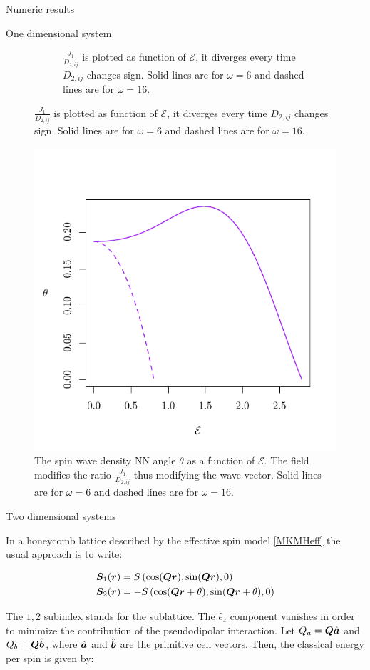 \begin{section}{Numeric results}
\begin{subsection}{One dimensional system}
\begin{figure}
\begin{subfigure}{.45\textwidth}
  \caption{$\frac{J_{1}}{D_{2,ij}}$ is plotted as function of $\mathcal{E}$, it diverges every time $D_{2,ij}$ changes sign. Solid lines are for $\omega = 6$ and dashed lines are for $\omega = 16$.}
  \label{Fig3.1:ratio}
\end{subfigure}
\label{Fig3.1}
\end{figure}

\begin{figure}
\centering
  \includegraphics[width=0.5\linewidth]{Figures/theta.pdf}
  \caption{The spin wave density NN angle $\theta$ as a function of $\mathcal{E}$. The field modifies the ratio $\frac{J_{1}}{D_{2,ij}}$ thus modifying the wave vector. Solid lines are for $\omega = 6$ and dashed lines are for $\omega = 16$.}
\label{Fig3.2}
\end{figure}

\end{subsection}

\begin{subsection}{Two dimensional systems}
 
In a honeycomb lattice described by the effective spin model \ref{MKMHeff} the usual approach is to write:

\begin{align}
\boldsymbol{S}_1(\boldsymbol{r}) &= S\left( \cos(\boldsymbol{Q}\boldsymbol{r}), \sin(\boldsymbol{Q}\boldsymbol{r}), 0 \right) \\
\boldsymbol{S}_2(\boldsymbol{r}) &= -S\left( \cos(\boldsymbol{Q}\boldsymbol{r} + \theta), \sin(\boldsymbol{Q}\boldsymbol{r} + \theta), 0 \right)
\end{align}

The $1, 2$ subindex stands for the sublattice. The $\hat{e}_z$ component vanishes in order to minimize the contribution of the pseudodipolar interaction. Let $Q_a = \boldsymbol{Q}\hat{\boldsymbol{a}}$ and $Q_b = \boldsymbol{Q}\hat{\boldsymbol{b}}$, where $\hat{\boldsymbol{a}}$ and $\hat{\boldsymbol{b}}$ are the primitive cell vectors. Then, the classical energy per spin is given by:


\end{subsection}
\end{section}
